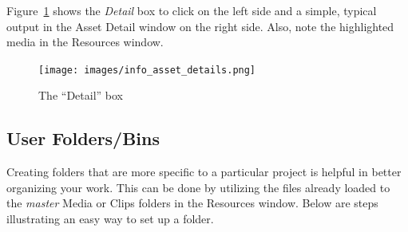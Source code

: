 Figure~\ref{fig:info_asset_details} shows the \textit{Detail} box to click on the left side and a simple, typical output in the Asset Detail window on the right side.  Also, note the highlighted media in the Resources window.

\begin{figure}[htpb]
    \centering
    \texttt{[image: images/info\_asset\_details.png]}
    \caption{The “Detail” box}
    \label{fig:info_asset_details}
\end{figure}

\subsection{User Folders/Bins}%
\label{sub:user_folders_bins}

Creating folders that are more specific to a particular project is helpful in better organizing your work.  
This can be done by utilizing the files already loaded to the \textit{master} Media or Clips folders in the Resources window.  
Below are steps illustrating an easy way to set up a folder.

